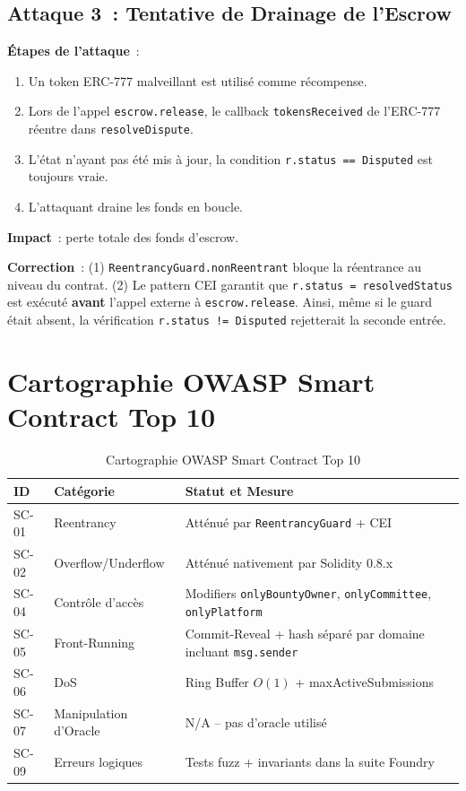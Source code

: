 \documentclass[12pt, a4paper]{report}
\begin{document}
\subsection{Attaque 3~: Tentative de Drainage de l'Escrow}
\textbf{\'{E}tapes de l'attaque}~:
\begin{enumerate}
    \item Un token ERC-777 malveillant est utilis\'{e} comme r\'{e}compense.
    \item Lors de l'appel \texttt{escrow.release}, le callback \texttt{tokensReceived} de l'ERC-777 r\'{e}entre dans \texttt{resolveDispute}.
    \item L'\'{e}tat n'ayant pas \'{e}t\'{e} mis \`{a} jour, la condition \texttt{r.status == Disputed} est toujours vraie.
    \item L'attaquant draine les fonds en boucle.
\end{enumerate}

\textbf{Impact}~: perte totale des fonds d'escrow.

\textbf{Correction}~: (1) \texttt{ReentrancyGuard.nonReentrant} bloque la r\'{e}entrance au niveau du contrat. (2) Le pattern CEI garantit que \texttt{r.status = resolvedStatus} est ex\'{e}cut\'{e} \textbf{avant} l'appel externe \`{a} \texttt{escrow.release}. Ainsi, m\^{e}me si le guard \'{e}tait absent, la v\'{e}rification \texttt{r.status != Disputed} rejetterait la seconde entr\'{e}e.

\section{Cartographie OWASP Smart Contract Top 10}
\begin{table}[H]
\centering
\begin{tabular}{@{}llp{7cm}@{}}
\toprule
\textbf{ID} & \textbf{Cat\'{e}gorie} & \textbf{Statut et Mesure} \\ \midrule
SC-01 & Reentrancy & Att\'{e}nu\'{e} par \texttt{ReentrancyGuard} + CEI \\
SC-02 & Overflow/Underflow & Att\'{e}nu\'{e} nativement par Solidity 0.8.x \\
SC-04 & Contr\^{o}le d'acc\`{e}s & Modifiers \texttt{onlyBountyOwner}, \texttt{onlyCommittee}, \texttt{onlyPlatform} \\
SC-05 & Front-Running & Commit-Reveal + hash s\'{e}par\'{e} par domaine incluant \texttt{msg.sender} \\
SC-06 & DoS & Ring Buffer $O(1)$ + maxActiveSubmissions \\
SC-07 & Manipulation d'Oracle & N/A -- pas d'oracle utilis\'{e} \\
SC-09 & Erreurs logiques & Tests fuzz + invariants dans la suite Foundry \\ \bottomrule
\end{tabular}
\caption{Cartographie OWASP Smart Contract Top 10}
\end{table}
\end{document}
